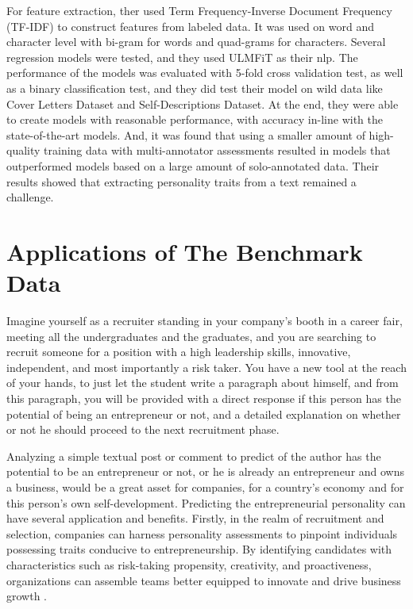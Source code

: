 For feature extraction, ther used Term Frequency-Inverse Document Frequency (TF-IDF) to construct features from labeled data. It was used on word and character level with bi-gram for words and quad-grams for characters. Several regression models were tested, and they used ULMFiT as their \ac{nlp}. The performance of the models was evaluated with 5-fold cross validation test, as well as a binary classification test, and they did test their model on wild data like Cover Letters Dataset and Self-Descriptions Dataset. At the end, they were able to create models with reasonable performance, with accuracy in-line with the state-of-the-art models. And, it was found that using a smaller amount of high-quality training data with multi-annotator assessments resulted in models that outperformed models based on a large amount of solo-annotated data. Their results showed that extracting personality traits from a text remained a challenge.

\section{Applications of The Benchmark Data}
Imagine yourself as a recruiter standing in your company's booth in a career fair, meeting all the undergraduates and the graduates, and you are searching to recruit someone for a position with a high leadership skills, innovative, independent, and most importantly a risk taker. You have a new tool at the reach of your hands, to just let the student write a paragraph about himself, and from this paragraph, you will be provided with a direct response if this person has the potential of being an entrepreneur or not, and a detailed explanation on whether or not he should proceed to the next recruitment phase.

Analyzing a simple textual post or comment to predict of the author has the potential to be an entrepreneur or not, or he is already an entrepreneur and owns a business, would be a great asset for companies, for a country's economy and for this person's own self-development. Predicting the entrepreneurial personality can have several application and benefits. Firstly, in the realm of recruitment and selection, companies can harness personality assessments to pinpoint individuals possessing traits conducive to entrepreneurship. By identifying candidates with characteristics such as risk-taking propensity, creativity, and proactiveness, organizations can assemble teams better equipped to innovate and drive business growth \cite{el2022deep}. 

